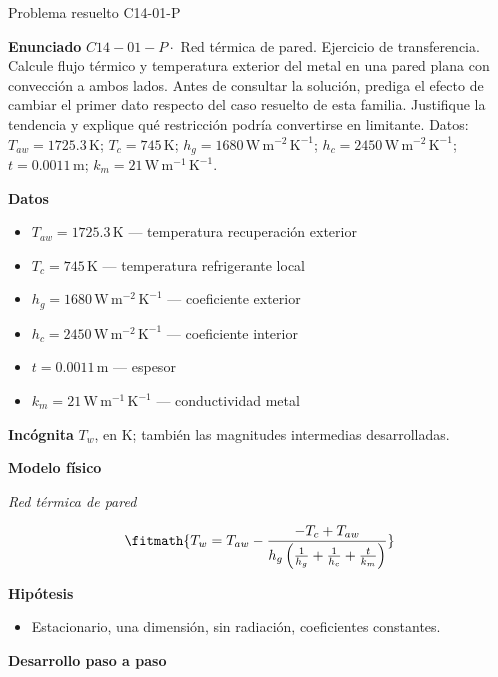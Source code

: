 \documentclass[10pt,openany]{book}
\begin{document}
\begin{studiumworked}{Problema resuelto C14-01-P}


\noindent\textbf{Enunciado}
\(C14-01-P \cdot\) Red térmica de pared. Ejercicio de transferencia. Calcule flujo térmico y temperatura exterior del metal en una pared plana con convección a ambos lados. Antes de consultar la solución, prediga el efecto de cambiar el primer dato respecto del caso resuelto de esta familia. Justifique la tendencia y explique qué restricción podría convertirse en limitante. Datos: \(T_{aw}=1725.3\, \mathrm{K}\); \(T_c=745\, \mathrm{K}\); \(h_g=1680\, \mathrm{W}\,\mathrm{m}^{-2}\,\mathrm{K}^{-1}\); \(h_c=2450\, \mathrm{W}\,\mathrm{m}^{-2}\,\mathrm{K}^{-1}\); \(t=0.0011\, \mathrm{m}\); \(k_m=21\, \mathrm{W}\,\mathrm{m}^{-1}\,\mathrm{K}^{-1}\).

\noindent\textbf{Datos}
\begin{itemize}
\item $T_{aw} = 1725.3\,\mathrm{K}$ — temperatura recuperación exterior
\item $T_c = 745\,\mathrm{K}$ — temperatura refrigerante local
\item $h_g = 1680\,\mathrm{W}\,\mathrm{m}^{-2}\,\mathrm{K}^{-1}$ — coeficiente exterior
\item $h_c = 2450\,\mathrm{W}\,\mathrm{m}^{-2}\,\mathrm{K}^{-1}$ — coeficiente interior
\item $t = 0.0011\,\mathrm{m}$ — espesor
\item $k_m = 21\,\mathrm{W}\,\mathrm{m}^{-1}\,\mathrm{K}^{-1}$ — conductividad metal
\end{itemize}

\noindent\textbf{Incógnita}
$T_w$, en $\mathrm{K}$; también las magnitudes intermedias desarrolladas.

\noindent\textbf{Modelo físico}

\noindent\textit{Red térmica de pared}

\[
\fitmath{T_w=T_{aw} - \frac{- T_c + T_{aw}}{h_g \left(\frac{1}{h_g} + \frac{1}{h_c} + \frac{t}{k_m}\right)}}
\]

\noindent\textbf{Hipótesis}
\begin{itemize}
\item Estacionario, una dimensión, sin radiación, coeficientes constantes.
\end{itemize}

\noindent\textbf{Desarrollo paso a paso}




\end{studiumworked}
\end{document}

